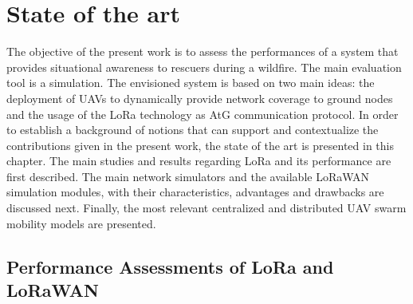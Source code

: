 
\chapter{State of the art}
\label{chapter:stateoftheart}

The objective of the present work is to assess the performances of a system that provides situational awareness to rescuers during a wildfire. The main evaluation tool is a simulation. The envisioned system is based on two main ideas: the deployment of \glspl{UAV} to dynamically provide network coverage to ground nodes and the usage of the LoRa technology as \gls{AtG} communication protocol. In order to establish a background of notions that can support and contextualize the contributions given in the present work, the state of the art is presented in this chapter. The main studies and results regarding LoRa and its performance are first described. The main network simulators and the available LoRaWAN simulation modules, with their characteristics, advantages and drawbacks are discussed next. Finally, the most relevant centralized and distributed \gls{UAV} swarm mobility models are presented.


\section{Performance Assessments of LoRa and LoRaWAN}

